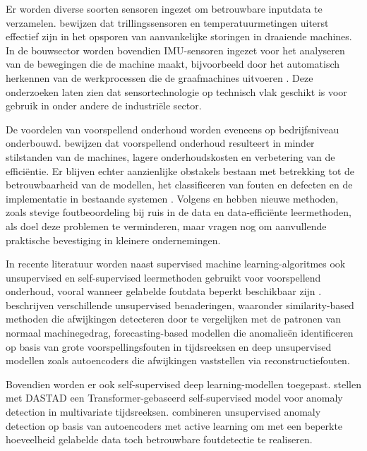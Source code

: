 Er worden diverse soorten sensoren ingezet om betrouwbare inputdata te verzamelen. \textcite{Nayak2024} bewijzen dat trillingssensoren en temperatuurmetingen uiterst effectief zijn in het opsporen van aanvankelijke storingen in draaiende machines. In de bouwsector worden bovendien IMU-sensoren ingezet voor het analyseren van de bewegingen die de machine maakt, bijvoorbeeld door het automatisch herkennen van de werkprocessen die de graafmachines uitvoeren \autocite{Molaei2024}. Deze onderzoeken laten zien dat sensortechnologie op technisch vlak geschikt is voor gebruik in onder andere de industriële sector.

De voordelen van voorspellend onderhoud worden eveneens op bedrijfsniveau onderbouwd. \textcite{ErRatby2025} bewijzen dat voorspellend onderhoud resulteert in minder stilstanden van de machines, lagere onderhoudskosten en verbetering van de efficiëntie. Er blijven echter aanzienlijke obstakels bestaan met betrekking tot de betrouwbaarheid van de modellen, het classificeren van fouten en defecten en de implementatie in bestaande systemen \autocite{Roehrich2024, Elahi2023}. Volgens \textcite{Wang2025} en \textcite{Holtz2025} hebben nieuwe methoden, zoals stevige foutbeoordeling bij ruis in de data en data-efficiënte leermethoden, als doel deze problemen te verminderen, maar vragen nog om aanvullende praktische bevestiging in kleinere ondernemingen.

In recente literatuur worden naast supervised machine learning-algoritmes ook unsupervised en self-supervised leermethoden gebruikt voor voorspellend onderhoud, vooral wanneer gelabelde foutdata beperkt beschikbaar zijn \autocite{Elahi2023}. \textcite{Giannoulidis2024} beschrijven verschillende unsupervised benaderingen, wa\-aro\-nder similarity-based methoden die afwijkingen detecteren door te vergelijken met de patronen van normaal machinegedrag, forecasting-based modellen die anomalieën identificeren op basis van grote voorspellingsfouten in tijdsreeksen en deep unsupervised modellen zoals autoencoders die afwijkingen vaststellen via reconstructiefouten.

Bovendien worden er ook self-supervised deep learning-modellen toegepast. \textcite{Aggarwal2025} stellen met DASTAD een Transformer-gebaseerd self-supervised model voor anomaly detection in multivariate tijdsreeksen. \textcite{Holtz2025} combineren unsupervised anomaly detection op basis van autoencoders met active learning om met een beperkte hoeveelheid gelabelde data toch betrouwbare foutdetectie te realiseren.

